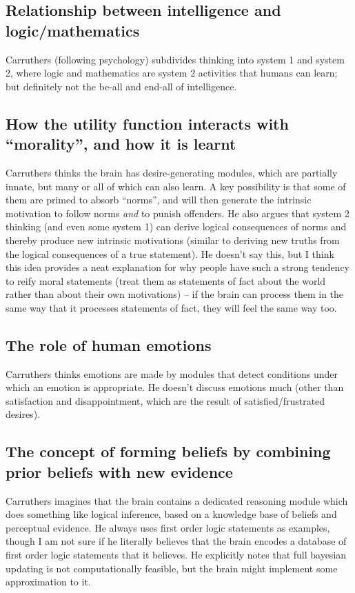 \documentclass[10pt,a4paper]{article}
\newcommand{\nquote}[1]{``{#1}''}
\begin{document}
\subsection{Relationship between intelligence and logic/mathematics}
Carruthers (following psychology) subdivides thinking into system 1 and system 2, where logic and mathematics are system 2 activities that humans can learn; but definitely not the be-all and end-all of intelligence.

\subsection{How the utility function interacts with \nquote{morality}, and how it is learnt}
Carruthers thinks the brain has desire-generating modules, which are partially innate, but many or all of which can also learn. A key possibility is that some of them are primed to absorb \nquote{norms}, and will then generate the intrinsic motivation to follow norms \emph{and} to punish offenders. He also argues that system 2 thinking (and even some system 1) can derive logical consequences of norms and thereby produce new intrinsic motivations (similar to deriving new truths from the logical consequences of a true statement). He doesn't say this, but I think this idea provides a neat explanation for why people have such a strong tendency to reify moral statements (treat them as statements of fact about the world rather than about their own motivations) -- if the brain can process them in the same way that it processes statements of fact, they will feel the same way too.

\subsection{The role of human emotions}
Carruthers thinks emotions are made by modules that detect conditions under which an emotion is appropriate. He doesn't discuss emotions much (other than satisfaction and disappointment, which are the result of satisfied/frustrated desires).

\subsection{The concept of forming beliefs by combining prior beliefs with new evidence}
Carruthers imagines that the brain contains a dedicated reasoning module which does something like logical inference, based on a knowledge base of beliefs and perceptual evidence. He always uses first order logic statements as examples, though I am not sure if he literally believes that the brain encodes a database of first order logic statements that it believes. He explicitly notes that full bayesian updating is not computationally feasible, but the brain might implement some approximation to it.
\end{document}
